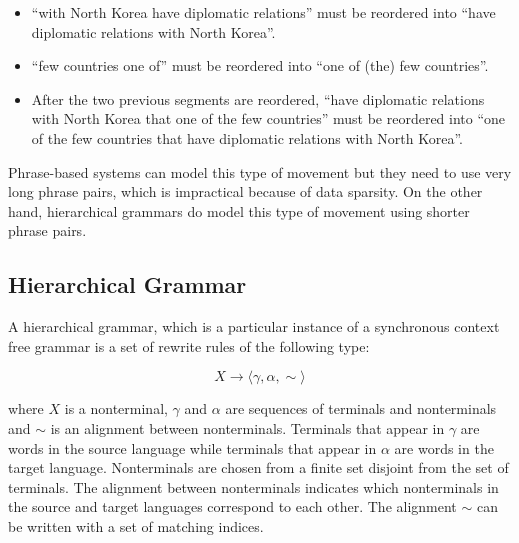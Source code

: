   
  

  \begin{itemize}
    \item ``with North Korea have diplomatic relations'' must be reordered into 
      ``have diplomatic relations with North Korea''.
    \item ``few countries one of'' must be reordered into ``one of (the) few countries''.
    \item After the two previous segments are reordered, ``have diplomatic relations with North Korea that one of the few countries'' must be reordered into ``one of the few countries that have diplomatic relations with North Korea''.
  \end{itemize}
%
  Phrase-based systems can model this type of movement but they need to use very long phrase pairs, which is
  impractical because of data sparsity. On the other hand, hierarchical grammars do model this type of movement using
  shorter phrase pairs.

  \subsection{Hierarchical Grammar} \label{sec:hiergrammar}

  A hierarchical grammar, which is a particular instance of a synchronous context free grammar is a set of rewrite rules of the following type:

  \begin{equation}
    X \rightarrow \langle \gamma, \alpha, \sim \rangle \nonumber
  \end{equation}

  \noindent where $X$ is a nonterminal, $\gamma$ and $\alpha$ are sequences of terminals and nonterminals and $\sim$ is an alignment
  between nonterminals. Terminals that appear in $\gamma$ are words in the source language while terminals that appear in $\alpha$ are
  words in the target language. Nonterminals are chosen from a finite set disjoint from the set of terminals. The alignment between nonterminals
  indicates which nonterminals in the source and target languages correspond to each other. The alignment $\sim$ can be written with 
  a set of matching indices.

